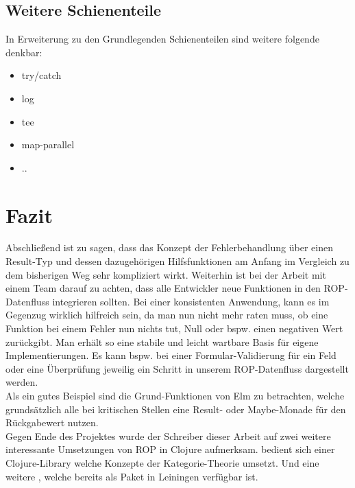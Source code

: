 \documentclass[10pt,journal,compsoc]{IEEEtran}
\begin{document}
  \subsection{Weitere Schienenteile}
  In Erweiterung zu den Grundlegenden Schienenteilen sind weitere folgende denkbar:
  \begin{itemize}
    \item try/catch
    \item log
    \item tee
    \item map-parallel
    \item ..
  \end{itemize}

  \section{Fazit}
  Abschließend ist zu sagen, dass das Konzept der Fehlerbehandlung über einen Result-Typ und dessen dazugehörigen Hilfsfunktionen am Anfang im Vergleich zu dem bisherigen Weg sehr kompliziert wirkt.
  Weiterhin ist bei der Arbeit mit einem Team darauf zu achten, dass alle Entwickler neue Funktionen in den ROP-Datenfluss integrieren sollten.
  Bei einer konsistenten Anwendung, kann es im Gegenzug wirklich hilfreich sein, da man nun nicht mehr raten muss, ob eine Funktion bei einem Fehler nun nichts tut, Null oder bspw. einen negativen Wert zurückgibt.
  Man erhält so eine stabile und leicht wartbare Basis für eigene Implementierungen.
  Es kann bspw. bei einer Formular-Validierung für ein Feld oder eine Überprüfung jeweilig ein Schritt in unserem ROP-Datenfluss dargestellt werden.\\
  Als ein gutes Beispiel sind die Grund-Funktionen von Elm \cite{elm} zu betrachten, welche grundsätzlich alle bei kritischen Stellen eine Result- oder Maybe-Monade für den Rückgabewert nutzen.\\
  Gegen Ende des Projektes wurde der Schreiber dieser Arbeit auf zwei weitere interessante Umsetzungen von ROP in Clojure aufmerksam. \cite{otherrop} bedient sich einer Clojure-Library \cite{clojurecats} welche Konzepte der Kategorie-Theorie umsetzt. Und eine weitere \cite{otherrop2}, welche bereits als Paket in Leiningen verfügbar ist.
\end{document}
